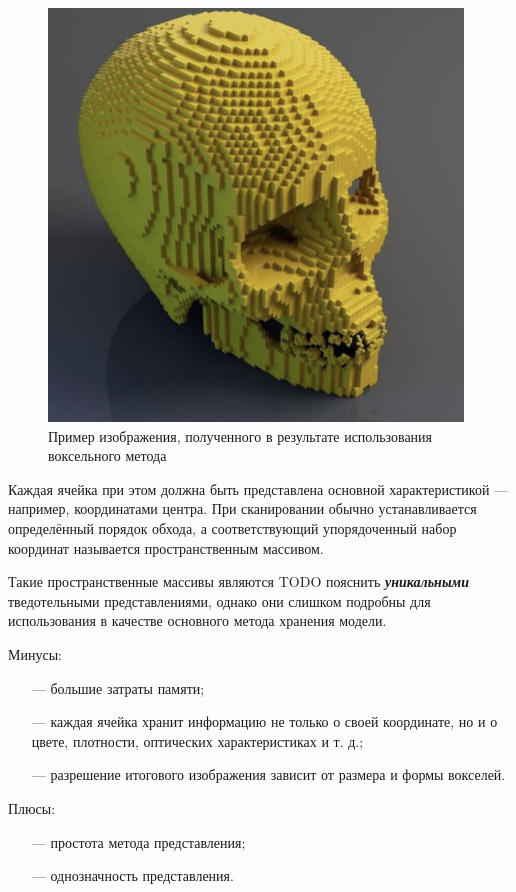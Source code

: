 \begin{figure}[h]
	\centering
	\captionsetup{justification=centering}
	\includegraphics[width=110mm]{img/numeric.png}
	\caption{Пример изображения, полученного в результате 
		использования воксельного метода}
	\label{fig:numeric}
\end{figure}

Каждая ячейка при этом должна быть представлена основной 
характеристикой --- например, координатами центра.
При сканировании 
обычно устанавливается определённый порядок обхода, а соответствующий 
упорядоченный набор координат называется пространственным массивом.

Такие пространственные массивы являются TODO пояснить \textit{\textbf{уникальными}} тведотельными 
представлениями, однако они слишком подробны для использования в качестве 
основного метода хранения модели.

Минусы:
\begin{itemize}[leftmargin=1.6\parindent]
	\item[---] большие затраты памяти;
	\item[---] каждая ячейка хранит информацию не только о своей координате, но и о цвете, плотности, оптических характеристиках и т. д.;
	\item[---] разрешение итогового изображения зависит от размера и формы вокселей.
\end{itemize}

Плюсы:
\begin{itemize}[leftmargin=1.6\parindent]
	\item[---] простота метода представления;
	\item[---] однозначность представления.
\end{itemize}

